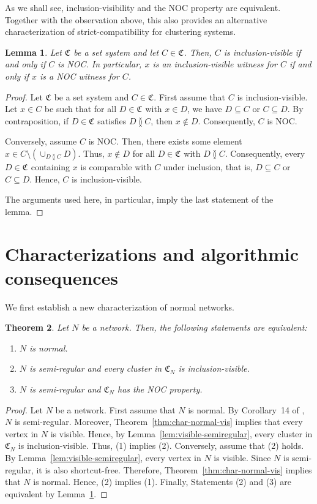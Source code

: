 \documentclass[preprint]{elsarticle}
\newtheorem{theorem}{Theorem}
\newtheorem{lemma}[theorem]{Lemma}
\newcommand{\CS}[1][]{\ensuremath{\mathfrak{C}_{#1}}}
\newcommand{\overlaps}{\between}
\begin{document}
As we shall see, inclusion-visibility and the NOC property are equivalent.
Together with the observation above, this also provides an alternative characterization of strict-compatibility for
clustering systems.

\begin{lemma}\label{lem:clusters-visible-noc}
	Let $\CS$ be a set system and let $C\in\CS$. Then, $C$ is inclusion-visible if and only if
	$C$ is NOC. In particular, $x$ is an inclusion-visible witness for $C$ if and only if $x$
	is a NOC witness for $C$.
\end{lemma}
\begin{proof}
	Let $\CS$ be a set system and $C\in\CS$. First assume that $C$ is inclusion-visible. Let
	$x\in C$ be such that for all $D\in\CS$ with $x\in D$, we have $D\subseteq C$ or $C\subseteq D$.
	By contraposition, if $D\in\CS$ satisfies $D\overlaps C$, then $x\notin D$. Consequently, $C$ is NOC.

	Conversely, assume $C$ is NOC. Then, there exists some element 
	$x\in C\setminus (\cup_{D\overlaps C} D)$. Thus, $x\notin D$ for all
	$D\in\CS$ with $D\overlaps C$. Consequently, every $D\in\CS$ containing $x$ is comparable with
	$C$ under inclusion, that is, $D\subseteq C$ or $C\subseteq D$. Hence, $C$ is inclusion-visible.
	
	The arguments used here, in particular, imply the last statement of the lemma.
\end{proof}


\section{Characterizations and algorithmic consequences}


We first establish a new characterization of normal networks.

\begin{theorem}\label{thm:normal-characterization}
Let $N$ be a network. Then, the following statements are equivalent:
\begin{enumerate}[(1)]
\item $N$ is normal.
\item $N$ is semi-regular and every cluster in $\CS[N]$ is inclusion-visible.
\item $N$ is semi-regular and $\CS[N]$ has the NOC property.
\end{enumerate}
\end{theorem}
\begin{proof}
Let $N$ be a network. First assume that $N$ is normal. By Corollary~14 of \cite{Hellmuth:2023},
$N$ is semi-regular. Moreover, Theorem~\ref{thm:char-normal-vis} implies that every vertex in
$N$ is visible. Hence, by Lemma~\ref{lem:visible-semiregular}, every
cluster in $\CS[N]$ is inclusion-visible. Thus, (1) implies (2).
Conversely, assume that (2) holds. By Lemma~\ref{lem:visible-semiregular},
every vertex in $N$ is visible. Since $N$ is semi-regular, it is
also shortcut-free. Therefore, Theorem~\ref{thm:char-normal-vis} implies that $N$ is normal.
Hence, (2) implies (1). Finally, Statements (2) and (3) are equivalent by
Lemma~\ref{lem:clusters-visible-noc}.
\end{proof}
\end{document}

